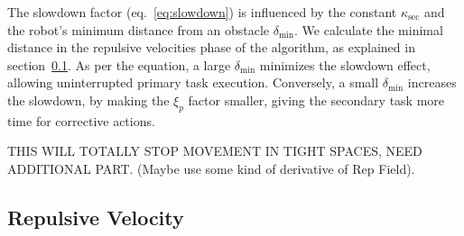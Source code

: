 \documentclass[]{article}
\begin{document}
The slowdown factor (eq.~\ref{eq:slowdown}) is influenced by the constant \( \kappa_{\text{sec}} \) and the robot's minimum distance from an obstacle \( \delta_{\text{min}} \). We calculate the minimal distance in the repulsive velocities phase of the algorithm, as explained in section~\ref{chap:repulsive velocity}. As per the equation, a large \( \delta_{\text{min}} \) minimizes the slowdown effect, allowing uninterrupted primary task execution. Conversely, a small \( \delta_{\text{min}} \) increases the slowdown, by making the $\xi_{p}$ factor smaller, giving the secondary task more time for corrective actions.

\alert{THIS WILL TOTALLY STOP MOVEMENT IN TIGHT SPACES, NEED ADDITIONAL PART. (Maybe use some kind of derivative of Rep Field).}

\subsection{Repulsive Velocity}
\label{chap:repulsive velocity}
\end{document}

